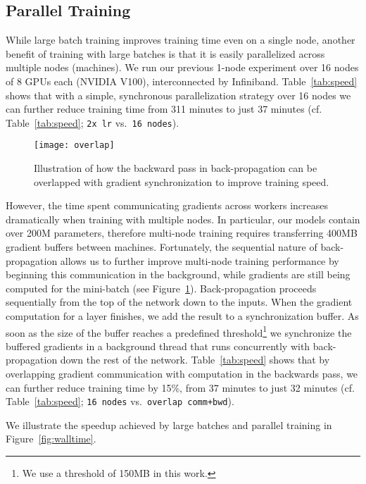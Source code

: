 \documentclass[11pt,a4paper]{article}
\newcommand{\mamark}[1]{\textcolor{orange}{{#1}}}
\begin{document}
\subsection{Parallel Training}\label{sec:parallel}

While large batch training improves training time even on a single node,
another benefit of training with large batches is that it is easily parallelized across multiple nodes (machines).
We run our previous 1-node experiment over 16 nodes of 8 GPUs each (NVIDIA V100), interconnected by Infiniband.
Table~\ref{tab:speed} shows that with a simple, synchronous parallelization strategy over 16 nodes we can further reduce training time from 311 minutes to just 37 minutes (cf. Table~\ref{tab:speed}; \texttt{2x lr} vs.~\texttt{16 nodes}).

\begin{figure}
\begin{center}
\texttt{[image: overlap]}
\end{center}
\caption{Illustration of how the backward pass in back-propagation  can be overlapped with gradient synchronization to improve training speed.}
\label{fig:overlap}
\end{figure}


However, the time spent communicating gradients across workers increases dramatically when training with multiple nodes.
In particular, our models contain over 200M parameters, therefore multi-node training requires transferring 400MB gradient buffers between machines.
Fortunately, the sequential nature of back-propagation allows us to further improve multi-node training performance by beginning this communication in the background, while gradients are still being computed for the mini-batch (see Figure~\ref{fig:overlap}).
Back-propagation proceeds sequentially from the top of the network down to the inputs.
When the gradient computation for a layer finishes, we add the result to a synchronization buffer. 
As soon as the size of the buffer reaches a predefined threshold\footnote{We use a threshold of 150MB in this work.} we synchronize the buffered gradients in a background thread that runs concurrently with back-propagation down the rest of the network.
Table~\ref{tab:speed} shows that by overlapping gradient communication with computation in the backwards pass,
we can further reduce training time by 15\%, from 37 minutes to just 32 minutes (cf. Table~\ref{tab:speed}; \texttt{16 nodes} vs.~\texttt{overlap comm+bwd}).

We illustrate the speedup achieved by large batches and parallel training in Figure~\ref{fig:walltime}.
\end{document}
